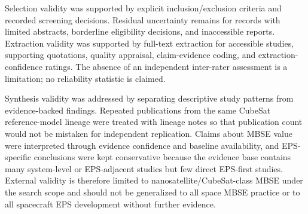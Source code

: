 Selection validity was supported by explicit inclusion/exclusion criteria and recorded screening decisions.  Residual uncertainty remains for records with limited abstracts, borderline eligibility decisions, and inaccessible reports.  Extraction validity was supported by full-text extraction for accessible studies, supporting quotations, quality appraisal, claim-evidence coding, and extraction-confidence ratings.  The absence of an independent inter-rater assessment is a limitation; no reliability statistic is claimed.

Synthesis validity was addressed by separating descriptive study patterns from evidence-backed findings.  Repeated publications from the same CubeSat reference-model lineage were treated with lineage notes so that publication count would not be mistaken for independent replication.  Claims about MBSE value were interpreted through evidence confidence and baseline availability, and EPS-specific conclusions were kept conservative because the evidence base contains many system-level or EPS-adjacent studies but few direct EPS-first studies.  External validity is therefore limited to nanosatellite/CubeSat-class MBSE under the search scope and should not be generalized to all space MBSE practice or to all spacecraft EPS development without further evidence.
